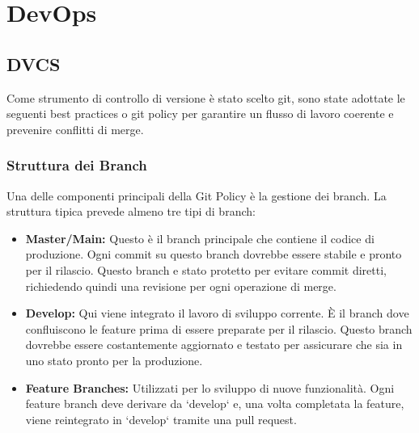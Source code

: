 \chapter{DevOps}
\label{ch:DevOps} %
\section{DVCS}

Come strumento di controllo di versione è stato scelto git, sono state adottate le seguenti best practices o git policy per garantire un flusso di lavoro coerente e prevenire conflitti di merge.

\subsection{Struttura dei Branch}

Una delle componenti principali della Git Policy è la gestione dei branch. La struttura tipica prevede almeno tre tipi di branch:
\begin{itemize}
\item \textbf{Master/Main:} Questo è il branch principale che contiene il codice di produzione. Ogni commit su questo branch dovrebbe essere stabile e pronto per il rilascio. Questo branch e stato protetto per evitare commit diretti, richiedendo quindi una revisione per ogni operazione di merge.
\item \textbf{Develop:} Qui viene integrato il lavoro di sviluppo corrente. È il branch dove confluiscono le feature prima di essere preparate per il rilascio. Questo branch dovrebbe essere costantemente aggiornato e testato per assicurare che sia in uno stato pronto per la produzione.
\item \textbf{Feature Branches:} Utilizzati per lo sviluppo di nuove funzionalità. Ogni feature branch deve derivare da `develop` e, una volta completata la feature, viene reintegrato in `develop` tramite una pull request.
\end{itemize}

